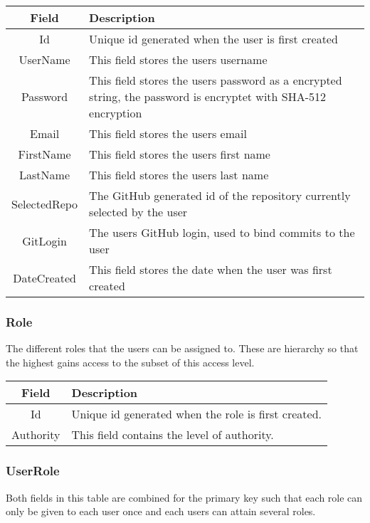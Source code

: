 \vspace{0.5cm}
\begin{tabularx}{\linewidth}{| c | X |}
    \hline
    \rowcolor[gray]{0.8}
    \textbf{Field} & \textbf{Description} \\
    \hline
    Id & Unique id generated when the user is first created\\ \hline
    UserName & This field stores the users username\\ \hline
   	Password & This field stores the users password as a encrypted string, the password is encryptet with SHA-512 encryption\\ \hline
    Email & This field stores the users email\\ \hline
    FirstName & This field stores the users first name\\ \hline
    LastName & This field stores the users last name\\ \hline
    SelectedRepo & The GitHub generated id of the repository currently selected by the user\\ \hline
    GitLogin & The users GitHub login, used to bind commits to the user\\ \hline
    DateCreated & This field stores the date when the user was first created\\
    \hline
\end{tabularx}
\vspace{0.5cm}

\subsubsection*{Role}
The different roles that the users can be assigned to. These are hierarchy so that the highest gains access to the subset of this access level. \\

\vspace{0.5cm}
\begin{tabularx}{\linewidth}{| c | X |}
    \hline
    \rowcolor[gray]{0.8}
    \textbf{Field} & \textbf{Description} \\
    \hline
    Id & Unique id generated when the role is first created.\\ \hline
    Authority & This field contains the level of authority.\\
    \hline
\end{tabularx}
\vspace{0.5cm}

\subsubsection*{UserRole}
Both fields in this table are combined for the primary key such that each role can only be given to each user once and each users can attain several roles. \\

